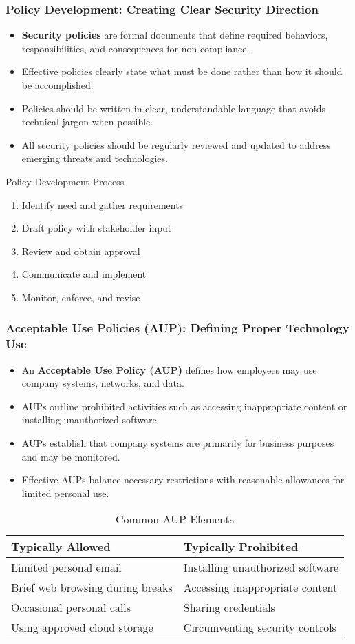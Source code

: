 \documentclass{beamer}
\begin{document}
\begin{frame}
\frametitle{Policy Development: Creating Clear Security Direction}
\begin{itemize}
\item \textbf{Security policies} are formal documents that define required behaviors, responsibilities, and consequences for non-compliance.
\item Effective policies clearly state what must be done rather than how it should be accomplished.
\item Policies should be written in clear, understandable language that avoids technical jargon when possible.
\item All security policies should be regularly reviewed and updated to address emerging threats and technologies.
\end{itemize}

\begin{block}{Policy Development Process}
\begin{enumerate}
\item Identify need and gather requirements
\item Draft policy with stakeholder input
\item Review and obtain approval
\item Communicate and implement
\item Monitor, enforce, and revise
\end{enumerate}
\end{block}
\end{frame}

\begin{frame}
\frametitle{Acceptable Use Policies (AUP): Defining Proper Technology Use}
\begin{itemize}
\item An \textbf{Acceptable Use Policy (AUP)} defines how employees may use company systems, networks, and data.
\item AUPs outline prohibited activities such as accessing inappropriate content or installing unauthorized software.
\item AUPs establish that company systems are primarily for business purposes and may be monitored.
\item Effective AUPs balance necessary restrictions with reasonable allowances for limited personal use.
\end{itemize}

\begin{table}
\small
\begin{tabular}{|p{5cm}|p{5cm}|}
\hline
\textbf{Typically Allowed} & \textbf{Typically Prohibited} \\
\hline
Limited personal email & Installing unauthorized software \\
Brief web browsing during breaks & Accessing inappropriate content \\
Occasional personal calls & Sharing credentials \\
Using approved cloud storage & Circumventing security controls \\
\hline
\end{tabular}
\caption{Common AUP Elements}
\end{table}
\end{frame}
\end{document}
